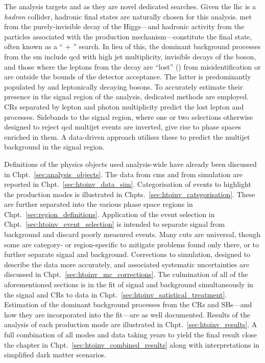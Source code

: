 The analysis targets \ttH and \VH as they are novel dedicated searches. Given the \acrshort{lhc} is a \emph{hadron} collider, hadronic final states are naturally chosen for this analysis. \Gls{met} from the purely-invisible decay of the Higgs---and hadronic activity from the particles associated with the production mechanism---constitute the final state, often known as a `` $+$ \ptvecmiss'' search. In lieu of this, the dominant background processes from the \acrlong{sm} include \acrshort{qcd} with high \gls{jet} multiplicity, invisible decays of the \PZ boson, and those where the leptons from the decay are ``lost'' (\lostlepton) from misidentification or are outside the bounds of the detector acceptance. The latter is predominantly populated by \ttbar and leptonically decaying \PW bosons. To accurately estimate their presence in the signal region of the analysis, dedicated methods are employed. \Glspl{CR} separated by lepton and photon multiplicity predict the lost lepton and \ztonunu processes. Sidebands to the signal region, where one or two selections otherwise designed to reject \acrshort{qcd} multijet events are inverted, give rise to phase spaces enriched in them. A data-driven approach utilises these to predict the multijet background in the signal region.

Definitions of the physics objects used analysis-wide have already been discussed in Chpt.~\ref{sec:analysis_objects}. The data from \acrshort{cms} and from simulation are reported in Chpt.~\ref{sec:htoinv_data_sim}. Categorisation of events to highlight the production modes is illustrated in Chpts.~\ref{sec:htoinv_categorisation}. These are further separated into the various phase space regions in Chpt.~\ref{sec:region_definitions}. Application of the event selection in Chpt.~\ref{sec:htoinv_event_selection} is intended to separate signal from background and discard poorly measured events. Many cuts are universal, though some are category- or region-specific to mitigate problems found only there, or to further separate signal and background. Corrections to simulation, designed to describe the data more accurately, and associated systematic uncertainties are discussed in Chpt.~\ref{sec:htoinv_mc_corrections}. The culmination of all of the aforementioned sections is in the fit of signal and background simultaneously in the signal and \glspl{CR} to data in Chpt.~\ref{sec:htoinv_satistical_treatment}. Estimation of the dominant background processes from the \glspl{CR} and \glspl{SB}---and how they are incorporated into the fit---are as well documented. Results of the analysis of each production mode are illustrated in Chpt.~\ref{sec:htoinv_results}. A full combination of all modes and data taking years to yield the final result close the chapter in Chpt.~\ref{sec:htoinv_combined_results} along with interpretations in simplified dark matter scenarios.


